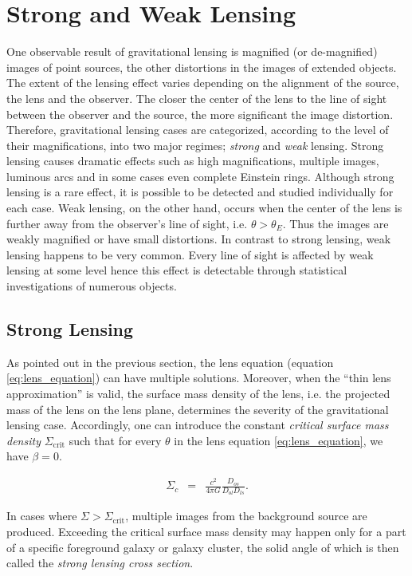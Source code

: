 \documentclass[a4wide,12pt]{book}
\begin{document}
{\section{Strong and Weak Lensing}
One observable result of gravitational lensing is magnified (or de-magnified) images of point sources, the other distortions in the images of extended objects. The extent of the lensing effect varies depending on the alignment of the source, the lens and the observer. The closer the center of the lens to the line of sight between the observer and the source, the more significant the image distortion. Therefore, gravitational lensing cases are categorized, according to the level of their magnifications, into two major regimes; \emph{strong} and \emph{weak} lensing. Strong lensing causes dramatic effects such as high magnifications, multiple images, luminous arcs and in some cases even complete Einstein rings. Although strong lensing is a rare effect, it is possible to be detected and studied individually for each case. Weak lensing, on the other hand, occurs when the center of the lens is further away from the observer's line of sight, i.e. $\theta > \theta_E$. Thus the images are weakly magnified or have small distortions. In contrast to strong lensing, weak lensing happens to be very common. Every line of sight is affected by weak lensing at some level hence this effect is detectable through statistical investigations of numerous objects. 

\subsection{Strong Lensing}
As pointed out in the previous section, the lens equation (equation \ref{eq:lens_equation}) can have multiple solutions. Moreover, when the ``thin lens approximation'' is valid, the surface mass density of the lens, i.e. the projected mass of the lens on the lens plane, determines the severity of the gravitational lensing case. Accordingly, one can introduce the constant \emph{critical surface mass density} $\Sigma_{\mathrm{crit}}$ such that for every $\theta$ in the lens equation \ref{eq:lens_equation}, we have $\beta = 0$.

\begin{eqnarray}
\label{eq:Sigma_crit}
\Sigma_c &=& \frac{c^2}{4 \pi G}\frac{D_{os}}{D_{ol} D_{ls}}.
\end{eqnarray}

In cases where $\Sigma > \Sigma_{\mathrm{crit}}$, multiple images from the background source are produced. Exceeding the critical surface mass density may happen only for a part of a specific foreground galaxy or galaxy cluster, the solid angle of which is then called the \emph{strong lensing cross section}. 

}
\end{document}
